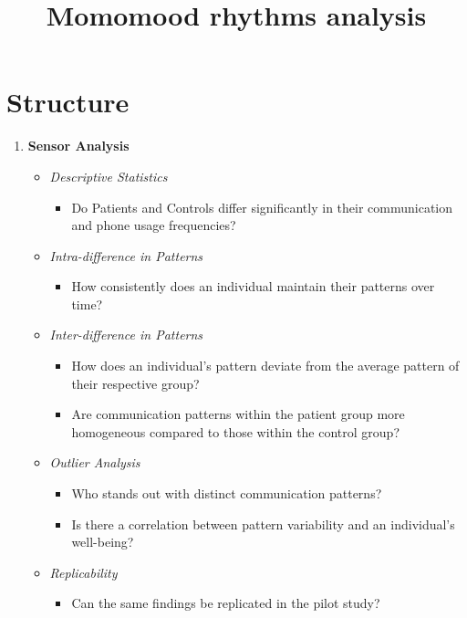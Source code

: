 \documentclass[journal, onecolumn, 11pt]{IEEEtran}
\begin{document}
\title{Momomood rhythms analysis}

\maketitle

\section{Structure}

\begin{enumerate}
    \item \textbf{Sensor Analysis}

    \begin{itemize}
        \item \textit{Descriptive Statistics}
        \begin{itemize}
            \item Do Patients and Controls differ significantly in their communication and phone usage frequencies?
        \end{itemize}

        \item \textit{Intra-difference in Patterns}
        \begin{itemize}
            \item How consistently does an individual maintain their patterns over time?
        \end{itemize}

        \item \textit{Inter-difference in Patterns}
        \begin{itemize}
            \item How does an individual's pattern deviate from the average pattern of their respective group?
            \item Are communication patterns within the patient group more homogeneous compared to those within the control group?
        \end{itemize}

        \item \textit{Outlier Analysis}
        \begin{itemize}
            \item Who stands out with distinct communication patterns?
            \item Is there a correlation between pattern variability and an individual's well-being?
        \end{itemize}

        \item \textit{Replicability}
        \begin{itemize}
            \item Can the same findings be replicated in the pilot study?
        \end{itemize}
    \end{itemize}
\end{enumerate}
\end{document}
